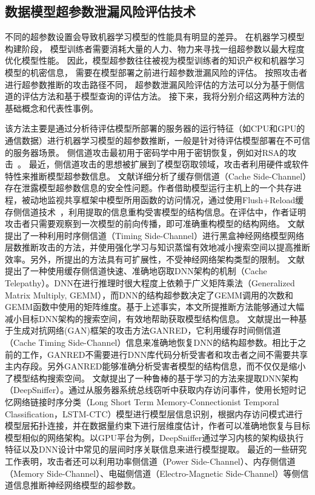 \subsection{数据模型超参数泄漏风险评估技术}
不同的超参数设置会导致机器学习模型的性能具有明显的差异。
在机器学习模型构建阶段，
模型训练者需要消耗大量的人力、物力来寻找一组超参数以最大程度优化模型性能。
因此，模型超参数往往被视为模型训练者的知识产权和机器学习模型的机密信息，
需要在模型部署之前进行超参数泄漏风险的评估。
按照攻击者进行超参数推断的攻击路径不同，
超参数泄漏风险评估的方法可以分为基于侧信道的评估方法和基于模型查询的评估方法。
接下来，我将分别介绍这两种方法的基础概念和代表性事例。

该方法主要是通过分析待评估模型所部署的服务器的运行特征（如CPU和GPU的通信数据）进行机器学习模型的超参数推断，一般是针对待评估模型部署在不可信的服务器场景。
侧信道攻击最初用于密码学中用于密钥恢复，例如对RSA的攻击~\cite{Kocher1996TimingAO}。
最近，侧信道攻击的思想被扩展到了模型窃取领域，攻击者利用硬件或软件特性来推断模型超参数信息。
文献{\rm\parencite{DBLP:journals/corr/abs-1810-03487}}详细分析了缓存侧信道（Cache Side-Channel）存在泄露模型超参数信息的安全性问题。作者借助模型运行主机上的一个共存进程，被动地监视共享框架中模型所用函数的访问情况，通过使用Flush+Reload缓存侧信道技术~\cite{Yarom2014FLUSHRELOADAH}，利用提取的信息重构受害模型的结构信息。在评估中，作者证明攻击者只需要观察到一次模型的前向传播，即可准确重构模型的结构网络。
文献{\rm\parencite{DSRB18}}提出了一种利用时序侧信道（Timing Side-Channel）进行黑盒神经网络模型网络层数推断攻击的方法，并使用强化学习与知识蒸馏有效地减小搜索空间以提高推断效率。另外，所提出的方法具有可扩展性，不受神经网络架构类型的限制。
文献{\rm\parencite{DBLP:conf/uss/YanFT20}}提出了一种使用缓存侧信道快速、准确地窃取DNN架构的机制（Cache Telepathy）。DNN在进行推理时很大程度上依赖于广义矩阵乘法（Generalized Matrix Multiply, GEMM），而DNN的结构超参数决定了GEMM调用的次数和GEMM函数中使用的矩阵维度。基于上述事实，本文所提推断方法能够通过大幅减小目标DNN架构的搜索空间，有效地帮助获取模型结构信息。
文献{\rm\parencite{Liu2020GANREDGR}}提出一种基于生成对抗网络(GAN)框架的攻击方法GANRED，它利用缓存时间侧信道（Cache Timing Side-Channel）信息来准确地恢复DNN的结构超参数。相比于之前的工作，GANRED不需要进行DNN库代码分析受害者和攻击者之间不需要共享主内存段。另外GANRED能够准确分析受害者模型的结构信息，而不仅仅是缩小了模型结构搜索空间。
文献{\rm\parencite{Hu2020DeepSnifferAD}}提出了一种鲁棒的基于学习的方法来提取DNN架构（DeepSniffer）。通过从服务器系统总线窃听中获取内存访问事件，使用长短时记忆网络链接时序分类（Long Short Term Memory-Connectionist Temporal Classification，LSTM-CTC）模型进行模型层信息识别，根据内存访问模式进行模型层拓扑连接，并在数据量约束下进行层维度估计，作者可以准确地恢复与目标模型相似的网络架构。以GPU平台为例，DeepSniffer通过学习内核的架构级执行特征以及DNN设计中常见的层间时序关联信息来进行模型提取。
最近的一些研究工作表明，攻击者还可以利用功率侧信道（Power Side-Channel）\cite{DBLP:journals/iacr/BatinaBJP18, Zhang2021StealingNN}、内存侧信道（Memory Side-Channel）\cite{Zhang2021StealingNN, DBLP:conf/sp/RakinCYF22}、电磁侧信道（Electro-Magnetic Side-Channel）\cite{liang2022clairvoyance, yu2020deepem}等侧信道信息推断神经网络模型的超参数。 


